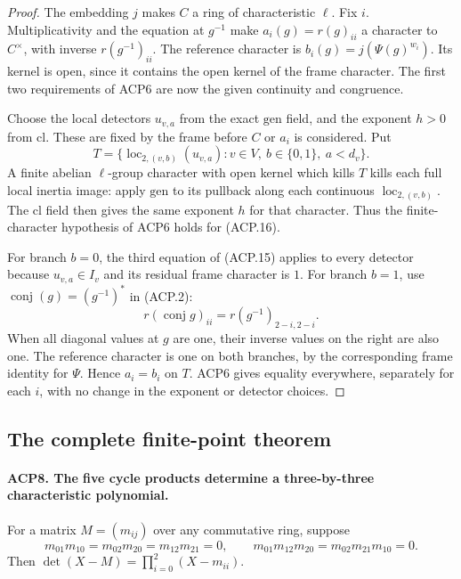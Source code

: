 \documentclass[11pt,a4paper]{article}
\numberwithin{equation}{section}
\theoremstyle{remark}\newtheorem{remark}[theorem]{Remark}
\begin{document}
\begin{proof}
The embedding \(j\) makes \(C\) a ring of characteristic
\(\ell\).  Fix \(i\).  Multiplicativity and the equation at
\(g^{-1}\) make \(a_i(g)=r(g)_{ii}\) a character to
\(C^\times\), with inverse \(r(g^{-1})_{ii}\).
The reference character is \(b_i(g)=j(\Psi(g)^{w_i})\).
Its kernel is open, since it contains the open kernel of the
frame character.  The first two requirements of ACP6 are now
the given continuity and congruence.

Choose the local detectors \(u_{v,a}\) from the exact
\(\mathrm{gen}\) field, and the exponent \(h>0\) from
\(\mathrm{cl}\).  These are fixed by the frame before \(C\)
or \(a_i\) is considered.  Put
\[
 T=\{\operatorname{loc}_{2,(v,b)}(u_{v,a}):
                        v\in V,\ b\in\{0,1\},\ a<d_v\}.
                                                        \tag{ACP.16}
\]
A finite abelian \(\ell\)-group character with open kernel
which kills \(T\) kills each full local inertia image:
apply \(\mathrm{gen}\) to its pullback along each continuous
\(\operatorname{loc}_{2,(v,b)}\).  The \(\mathrm{cl}\) field
then gives the same exponent \(h\) for that character.  Thus
the finite-character hypothesis of ACP6 holds for (ACP.16).

For branch \(b=0\), the third equation of (ACP.15) applies
to every detector because \(u_{v,a}\in I_v\) and its residual
frame character is \(1\).  For branch \(b=1\), use
\(\operatorname{conj}(g)=(g^{-1})^*\) in (ACP.2):
\[
 r(\operatorname{conj}g)_{ii}=r(g^{-1})_{2-i,2-i}.
\]
When all diagonal values at \(g\) are one, their inverse
values on the right are also one.  The reference character is
one on both branches, by the corresponding frame identity
for \(\Psi\).  Hence \(a_i=b_i\) on \(T\).
ACP6 gives equality everywhere, separately for each \(i\),
with no change in the exponent or detector choices.
\end{proof}

\subsection{The complete finite-point theorem}

\paragraph{ACP8. The five cycle products determine a three-by-three characteristic polynomial.}
\label{claim:ACP8}
For a matrix \(M=(m_{ij})\) over any commutative ring, suppose
\[
 m_{01}m_{10}=m_{02}m_{20}=m_{12}m_{21}=0,
 \qquad m_{01}m_{12}m_{20}=m_{02}m_{21}m_{10}=0.
                                                        \tag{ACP.17}
\]
Then \(\det(X-M)=\prod_{i=0}^2(X-m_{ii})\).
\end{document}
